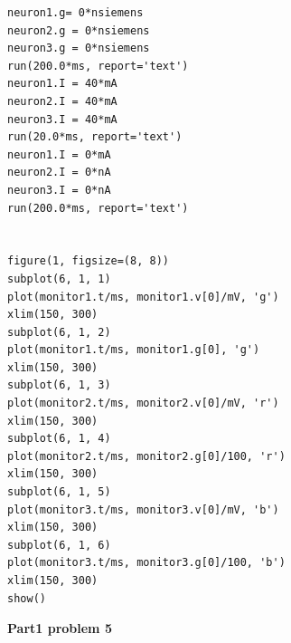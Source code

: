 \documentclass[12pt]{article}
\begin{document}
\begin{lstlisting}
neuron1.g= 0*nsiemens
neuron2.g = 0*nsiemens
neuron3.g = 0*nsiemens
run(200.0*ms, report='text')
neuron1.I = 40*mA
neuron2.I = 40*mA
neuron3.I = 40*mA
run(20.0*ms, report='text')
neuron1.I = 0*mA
neuron2.I = 0*nA
neuron3.I = 0*nA
run(200.0*ms, report='text')


figure(1, figsize=(8, 8))
subplot(6, 1, 1)
plot(monitor1.t/ms, monitor1.v[0]/mV, 'g')
xlim(150, 300)
subplot(6, 1, 2)
plot(monitor1.t/ms, monitor1.g[0], 'g')
xlim(150, 300)
subplot(6, 1, 3)
plot(monitor2.t/ms, monitor2.v[0]/mV, 'r')
xlim(150, 300)
subplot(6, 1, 4)
plot(monitor2.t/ms, monitor2.g[0]/100, 'r')
xlim(150, 300)
subplot(6, 1, 5)
plot(monitor3.t/ms, monitor3.v[0]/mV, 'b')
xlim(150, 300)
subplot(6, 1, 6)
plot(monitor3.t/ms, monitor3.g[0]/100, 'b')
xlim(150, 300)
show()
\end{lstlisting}
\newpage

\normalsize\textbf{Part1 problem 5}
\\
\end{document}
